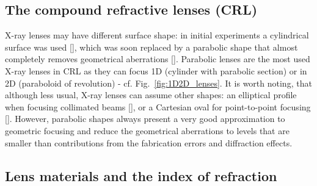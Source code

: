 \begin{refsection}
\section{The compound refractive lenses (CRL)}\label{sec:CRL}

X-ray lenses may have different surface shape: in initial experiments a cylindrical surface was used [\cite{Snigirev1996, Protopopov1998}], which was soon replaced by a parabolic shape that almost completely removes geometrical aberrations [\cite{Elleaume1998, Lengeler1999}]. Parabolic lenses are the most used X-ray lenses in CRL as they can focus 1D (cylinder with parabolic section) or in 2D (paraboloid of revolution) - cf. Fig.~\ref{fig:1D2D_lenses}. It is worth noting, that although less usual, X-ray lenses can assume other shapes: an elliptical profile when focusing collimated beams [\cite{Evans-Lutterodt2003}], or a Cartesian oval for point-to-point focusing [\cite{SanchezdelRio2012}]. However, parabolic shapes always present a very good approximation to geometric focusing and reduce the geometrical aberrations to levels that are smaller than contributions from the fabrication errors and diffraction effects.

\subsection{Lens materials and the index of refraction}\label{sec:interaction_with_matter}


\end{refsection}
